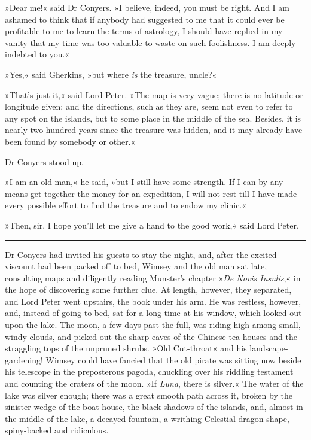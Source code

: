 »Dear me!« said Dr Conyers. »I believe, indeed, you must be right. And I am ashamed to think that if anybody had suggested to me that it could ever be profitable to me to learn the terms of astrology, I should have replied in my vanity that my time was too valuable to waste on such foolishness. I am deeply indebted to you.«

»Yes,« said Gherkins, »but where \textit{is} the treasure, uncle?«

»That's just it,« said Lord Peter. »The map is very vague; there is no latitude or longitude given; and the directions, such as they are, seem not even to refer to any spot on the islands, but to some place in the middle of the sea. Besides, it is nearly two hundred years since the treasure was hidden, and it may already have been found by somebody or other.«

Dr Conyers stood up.

»I am an old man,« he said, »but I still have some strength. If I can by any means get together the money for an expedition, I will not rest till I have made every possible effort to find the treasure and to endow my clinic.«

»Then, sir, I hope you'll let me give a hand to the good work,« said Lord Peter.

\noindent\hfil\rule{0.5\textwidth}{.4pt}\hfil 


Dr Conyers had invited his guests to stay the night, and, after the excited viscount had been packed off to bed, Wimsey and the old man sat late, consulting maps and diligently reading Munster's chapter »\textit{De Novis Insulis},« in the hope of discovering some further clue. At length, however, they separated, and Lord Peter went upstairs, the book under his arm. He was restless, however, and, instead of going to bed, sat for a long time at his window, which looked out upon the lake. The moon, a few days past the full, was riding high among small, windy clouds, and picked out the sharp eaves of the Chinese tea-houses and the straggling tops of the unpruned shrubs. »Old Cut-throat« and his landscape-gardening! Wimsey could have fancied that the old pirate was sitting now beside his telescope in the preposterous pagoda, chuckling over his riddling testament and counting the craters of the moon. »If \textit{Luna}, there is silver.« The water of the lake was silver enough; there was a great smooth path across it, broken by the sinister wedge of the boat-house, the black shadows of the islands, and, almost in the middle of the lake, a decayed fountain, a writhing Celestial dragon-shape, spiny-backed and ridiculous.

